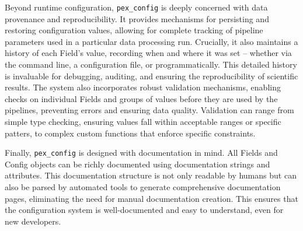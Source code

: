 Beyond runtime configuration, \texttt{pex\_config} is deeply concerned with data provenance and reproducibility.
It provides mechanisms for persisting and restoring configuration values, allowing for complete tracking of pipeline parameters used in a particular data processing run.
Crucially, it also maintains a history of each Field's value, recording when and where it was set -- whether via the command line, a configuration file, or programmatically.
This detailed history is invaluable for debugging, auditing, and ensuring the reproducibility of scientific results.
The system also incorporates robust validation mechanisms, enabling checks on individual Fields and groups of values before they are used by the pipelines, preventing errors and ensuring data quality.
Validation can range from simple type checking, ensuring values fall within acceptable ranges or specific patters, to complex custom functions that enforce specific constraints.


Finally, \texttt{pex\_config} is designed with documentation in mind.
All Fields and Config objects can be richly documented using documentation strings and attributes.
This documentation structure is not only readable by humans but can also be parsed by automated tools to generate comprehensive documentation pages, eliminating the need for manual documentation creation.
This ensures that the configuration system is well-documented and easy to understand, even for new developers.
